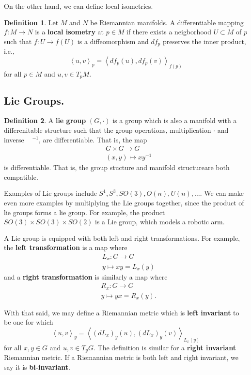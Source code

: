 \documentclass[12pt,letterpaper,boxed]{maths_v5}
\theoremstyle{definition}
\newtheorem{definition}{Definition}[section]
\begin{document}
On the other hand, we can define local isometries. 

\begin{definition}
    Let $M$ and $N$ be Riemannian manifolds. A differentiable mapping $f: M \to N$ 
    is a \textbf{local isometry}  at  $p \in M$ if there 
    exists a neigborhood $U \subset M$  of $p$ such that $f: U \to f(U)$ 
    is a diffeomorphism and $df_p$ preserves the inner product, i.e., 
    \[
        \left< u, v  \right>_p =\left<df_p(u), df_p(v) \right>_{f(p)}  
    \]
    for  all $p \in M$ and $u, v \in T_pM$. 
\end{definition}

\subsection*{Lie Groups.}
\begin{definition}
    A \textbf{lie group} $(G, \cdot)$ is a group which is also a manifold 
    with a differenitable structure such that the group operations, 
    multiplication $\cdot$ and inverse $\phantom{m}^{-1}$, are differentiable. 
    That is, the map 
    \begin{align*}
        &G \times G \to G\\
        &(x, y) \mapsto xy^{-1}
    \end{align*}
    is differentiable. That is, the group stucture and manifold structureare both 
    compatible.
\end{definition}

Examples of Lie groups include $S^1, S^3, SO(3), O(n), U(n), \dots$. 
We can make even more examples by multiplying the Lie groups together, 
since the product of lie groups forms a lie group. For example, the product  
$SO(3) \times SO(3)\times SO(2)$ is a Lie group, which models a robotic arm.

A Lie group is equipped with both left and right transformations.  For example, 
the \textbf{left transformation} is a map where 
\begin{align*}
    &L_x: G \to  G\\
    &y \mapsto xy = L_x(y)
\end{align*}
and a \textbf{right transformation} is similarly a map where 
\begin{align*}
    &R_x: G \to G\\
    &y \mapsto yx = R_x(y).
\end{align*}

With that said, we may define a Riemannian metric which is \textbf{left invariant} 
to be one for which 
\[
    \left<u, v \right>_y = \left< (dL_x)_y(u),(dL_x)_y(v)  \right>_{L_x(y)}
\]
for all $x, y \in G$ and $u, v \in T_yG$. The definition is similar for a 
\textbf{right invariant} Riemannian metric. If a Riemannian metric is both left and right invariant, 
we say it is \textbf{bi-invariant}.
\end{document}
